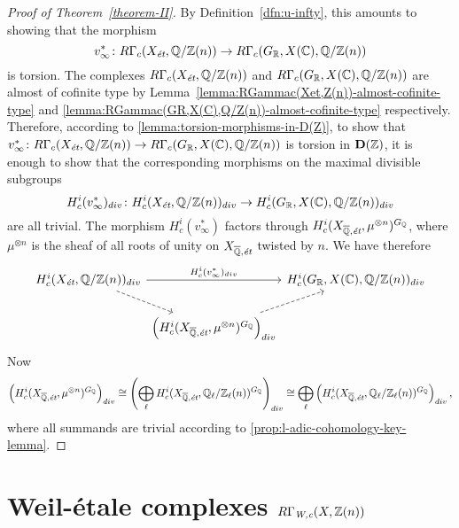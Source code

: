 \documentclass{article}
\numberwithin{equation}{section}
\begin{document}
\begin{proof}[Proof of Theorem~\ref{theorem-II}]
  By Definition~\ref{dfn:u-infty}, this amounts to showing that the morphism
  $$v_\infty^*\colon R\Gamma_c (X_\et, \QQ/\ZZ (n)) \to R\Gamma_c (G_\RR, X (\CC), \QQ/\ZZ (n))$$
  is torsion. The complexes $R\Gamma_c (X_\et, \QQ/\ZZ (n))$ and
  $R\Gamma_c (G_\RR, X (\CC), \QQ/\ZZ (n))$ are almost of cofinite type by
  Lemma~\ref{lemma:RGammac(Xet,Z(n))-almost-cofinite-type} and
  \ref{lemma:RGammac(GR,X(C),Q/Z(n))-almost-cofinite-type} respectively.
  Therefore, according to \ref{lemma:torsion-morphisms-in-D(Z)}, to show that
  $v^*_\infty\colon R\Gamma_c (X_\et, \QQ/\ZZ (n)) \to R\Gamma_c (G_\RR, X
  (\CC), \QQ/\ZZ (n))$ is torsion in $\mathbf{D} (\ZZ)$, it is enough to show
  that the corresponding morphisms on the maximal divisible subgroups
  \[ H^i_c (v^*_\infty)_{div}\colon H^i_c (X_\et, \QQ/\ZZ (n))_{div} \to
     H^i_c (G_\RR, X (\CC), \QQ/\ZZ (n))_{div} \]
  are all trivial. The morphism $H^i_c (v^*_\infty)$ factors through
  $H^i_c (X_{\overline{\QQ}, \text{\it ét}}, \mu^{\otimes n})^{G_\QQ}$, where
  $\mu^{\otimes n}$ is the sheaf of all roots of unity on
  $X_{\overline{\QQ}, \text{\it ét}}$ twisted by $n$.
  We have therefore
  \[ \begin{tikzcd}[column sep=0pt]
    H^i_c (X_\et, \QQ/\ZZ (n))_{div}\ar{rr}{H^i_c (v^*_\infty)_{div}}\ar[dashed]{dr} && H^i_c (G_\RR, X (\CC), \QQ/\ZZ (n))_{div}\\
    & \left(H^i_c (X_{\overline{\QQ}, \text{\it ét}}, \mu^{\otimes n})^{G_\QQ}\right)_{div}\ar[dashed]{ur}
  \end{tikzcd} \]
  Now
  \[ \left(H^i_c (X_{\overline{\QQ}, \text{\it ét}}, \mu^{\otimes n})^{G_\QQ}\right)_{div} \cong
  \left(\bigoplus_\ell H^i_c (X_{\overline{\QQ}, \text{\it ét}}, \QQ_\ell/\ZZ_\ell (n))^{G_\QQ}\right)_{div} \cong
  \bigoplus_\ell \left(H^i_c (X_{\overline{\QQ}, \text{\it ét}}, \QQ_\ell/\ZZ_\ell (n))^{G_\QQ}\right)_{div}, \]
  where all summands are trivial according to
  \ref{prop:l-adic-cohomology-key-lemma}.
\end{proof}


\section{Weil-étale complexes \texorpdfstring{$R\Gamma_\Wc (X, \ZZ(n))$}{RΓ\_W,c (X, ℤ(n))}}
\label{sec:RGamma-Wc}
\end{document}
